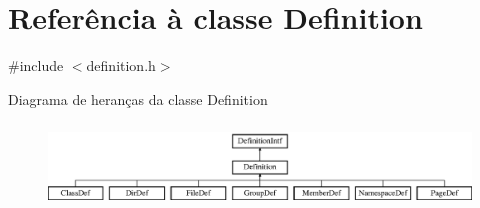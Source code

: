 \hypertarget{class_definition}{\section{Referência à classe Definition}
\label{class_definition}
}


{\ttfamily \#include $<$definition.\-h$>$}

Diagrama de heranças da classe Definition\begin{figure}[H]
\begin{center}
\leavevmode
\includegraphics[height=2.264151cm]{class_definition}
\end{center}
\end{figure}
